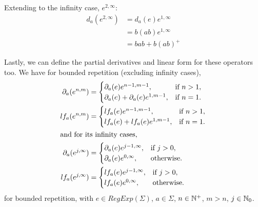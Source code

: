 Extending to the infinity case, $e^{2, \infty}$:
\begin{align*}
	d_a(e^{2, \infty}) &= d_a(e)e^{1, \infty} \\
	&= b(ab)e^{1,\infty} \\
	&= bab + b(ab)^+
\end{align*}

Lastly, we can define the partial derivatives and linear form for these operators too.
We have for bounded repetition (excluding infinity cases),
\begin{align*}
	\partial_a(e^{n,m}) &= \begin{cases}
		\partial_a(e)e^{n-1,m-1}, & \text{if $n > 1$}, \\
		\partial_a(e) + \partial_a(e)e^{1,m-1}, & \text{if $n=1$}.
	\end{cases} \\
	lf_a(e^{n,m}) &= \begin{cases}
		lf_a(e)e^{n-1,m-1}, & \text{if $n > 1$}, \\
		lf_a(e) + lf_a(e)e^{1,m-1}, & \text{if $n=1$}.
	\end{cases} \\
\intertext{and for its infinity cases,}
	\partial_a(e^{j,\infty}) &= \begin{cases}
		\partial_a(e)e^{j-1, \infty}, & \text{if $j > 0$}, \\
		\partial_a(e)e^{0, \infty}, & \text{otherwise}.
	\end{cases} \\
	lf_a(e^{j,\infty}) &= \begin{cases}
		lf_a(e)e^{j-1, \infty}, & \text{if $j > 0$}, \\
		lf_a(e)e^{0, \infty}, & \text{otherwise}.
	\end{cases}
\end{align*}
for bounded repetition, with $e \in RegExp(\Sigma)$, $a \in \Sigma$, $n \in {\mathbb{N}^{+}}$, $m>n$, $j \in {\mathbb{N}_{0}}$.


